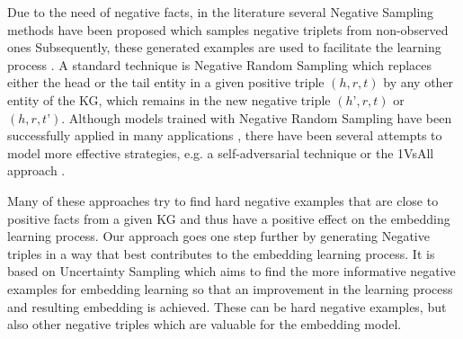 Due to the need of negative facts, in the literature several Negative Sampling methods have been proposed which samples negative triplets from non-observed ones \cite{Alam2020AffinityDN} 
Subsequently, these generated examples are used to facilitate the learning process . 
A standard technique is Negative Random Sampling which replaces either the head or the tail entity in a given positive triple $(h, r, t)$ by any other entity of the \ac{KG}, which remains in the new negative triple $(h’,r,t)$ or $(h,r,t’)$. 
Although models trained with Negative Random Sampling have been successfully applied in many applications \cite{TransE}, there have been several attempts to model more effective strategies, e.g. 
a self-adversarial technique \cite{RotatE} or the 1VsAll approach \cite{ConvE}.

Many of these approaches try to find hard negative examples that are close to positive facts from a given \ac{KG} and thus have a positive effect on the embedding learning process.
Our approach goes one step further by generating Negative triples in a way that best contributes to the embedding learning process. 
It is based on Uncertainty Sampling which aims to
find the more informative negative examples for embedding learning so that an improvement in the learning process and resulting embedding is achieved.
These can be hard negative examples, but also other negative triples which are valuable for the embedding model.